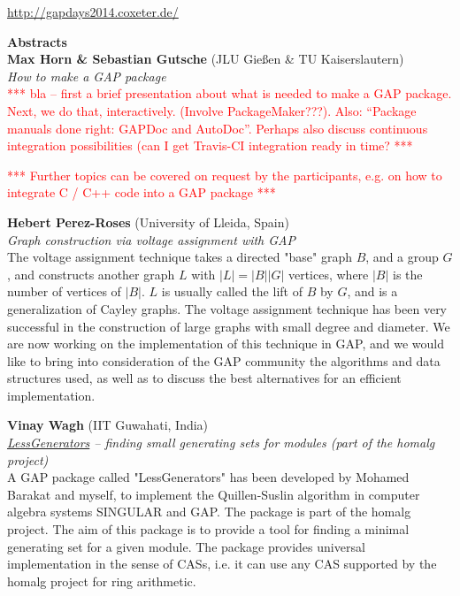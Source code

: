 \documentclass[11pt,a4paper]{article}
\newcommand{\TODO}[1]{\textcolor{red}{*** #1 ***}}
\begin{document}
\vfill

\begin{center}
  \url{http://gapdays2014.coxeter.de/}
\end{center}


\pagebreak



\newenvironment{Abstract}[3]{\noindent\textbf{#1} (#2) \\ \noindent \textit{#3} \\ \noindent}{\bigskip}


{\noindent\huge\textbf{Abstracts}} \\[1em]

\begin{Abstract}{Max Horn \& Sebastian Gutsche}{JLU Gießen \& TU Kaiserslautern}{How to make a GAP package}
\TODO{bla -- first a brief presentation about what is needed to make a GAP package.
Next, we do that, interactively. (Involve PackageMaker???). Also: ``Package manuals done right: GAPDoc and AutoDoc''.
Perhaps also discuss continuous integration possibilities (can I get Travis-CI integration ready in time?}

\TODO{Further topics can be covered on request by the participants, e.g. on how to integrate C / C++ code into a GAP package}
\end{Abstract}


\begin{Abstract}{Hebert Perez-Roses}{University of Lleida, Spain}{Graph construction via voltage assignment with GAP}
The voltage assignment technique takes a directed "base" graph $B$, and a
group $G$, and constructs another graph $L$ with $|L|=|B||G|$ vertices, where
$|B|$ is the number of vertices of $|B|$. $L$ is usually called the lift of $B$
by $G$, and is a generalization of Cayley graphs. The voltage assignment
technique has been very successful in the construction of large graphs
with small degree and diameter. We are now working on the implementation
of this technique in GAP, and we would like to bring into consideration
of the GAP community the algorithms and data structures used, as well as
to discuss the best alternatives for an efficient implementation.
\end{Abstract}


\begin{Abstract}{Vinay Wagh}{IIT Guwahati, India}{\href{https://github.com/homalg-project/LessGenerators}{LessGenerators} -- finding small generating sets for modules (part of the homalg project)}
	A GAP package called "LessGenerators" has been developed by Mohamed Barakat and myself, to implement the Quillen-Suslin algorithm in computer algebra systems SINGULAR and GAP. The package is part of the homalg project. The aim of this package is to provide a tool for finding a minimal generating set for a given module. The package provides universal implementation in the sense of CASs, i.e. it can use any CAS supported by the homalg project for ring arithmetic.
\end{Abstract}
\end{document}
